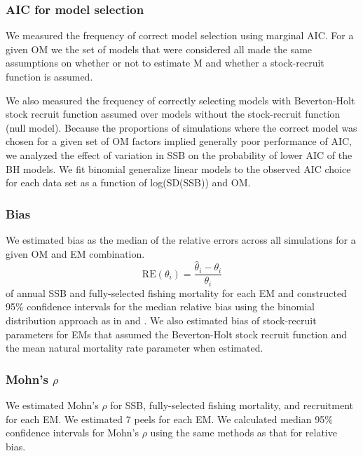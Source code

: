 \documentclass[
  12pt,
]{article}
\begin{document}
\hypertarget{aic-for-model-selection}{%
\subsubsection*{AIC for model selection}\label{aic-for-model-selection}}

We measured the frequency of correct model selection using marginal AIC.
For a given OM we the set of models that were considered all made the
same assumptions on whether or not to estimate M and whether a
stock-recruit function is assumed.

We also measured the frequency of correctly selecting models with
Beverton-Holt stock recruit function assumed over models without the
stock-recruit function (null model). Because the proportions of
simulations where the correct model was chosen for a given set of OM
factors implied generally poor performance of AIC, we analyzed the
effect of variation in SSB on the probability of lower AIC of the BH
models. We fit binomial generalize linear models to the observed AIC
choice for each data set as a function of log(SD(SSB)) and OM.

\hypertarget{bias}{%
\subsubsection*{Bias}\label{bias}}

We estimated bias as the median of the relative errors across all
simulations for a given OM and EM combination. \[
\text{RE}\left(\theta_i\right) = \frac{\widehat \theta_i - \theta_i}{\theta_i}
\] of annual SSB and fully-selected fishing mortality for each EM and
constructed 95\% confidence intervals for the median relative bias using
the binomial distribution approach as in \citet{millerhyun18} and
\citet{stockmiller21}. We also estimated bias of stock-recruit
parameters for EMs that assumed the Beverton-Holt stock recruit function
and the mean natural mortality rate parameter when estimated.

\hypertarget{mohns-rho}{%
\subsubsection*{\texorpdfstring{Mohn's
\(\rho\)}{Mohn's \textbackslash rho}}\label{mohns-rho}}

We estimated Mohn's \(\rho\) for SSB, fully-selected fishing mortality,
and recruitment for each EM. We estimated 7 peels for each EM. We
calculated median 95\% confidence intervals for Mohn's \(\rho\) using
the same methods as that for relative bias.
\end{document}
